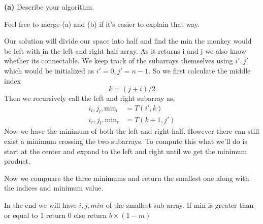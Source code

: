 \documentclass[12pt]{article}
\newcommand{\question}[3][Q]{
\begin{description}
\item \textbf{#1{#2}} #3
\end{description}
}
\newcommand{\note}[1]{{\footnotesize
    \begin{description}
    [leftmargin=3.4em,style=nextline]
        \item[Note:] {#1}
    \end{description}}   
}
\begin{document}
\question[]{(a)}{
    Describe your algorithm.
    \note{Feel free to merge (a) and (b) if it's easier to explain that way.}
}
\begin{answer}
    Our solution will divide our space into half and find the min the monkey would be left with in the left and right half array. As it returns i and j we also know whether its connectable. We keep track of the subarrays themselves using $i',j'$ which would be initialized as $i' = 0, j' = n - 1$. So we first calculate the middle index
    $$ k = (j + i) /2 $$ 
    Then we recursively call the left and right subarray as, 
    \begin{align*}
        i_l, j_l, \text{min}_l &= T(i', k)\\
        i_r, j_l, \text{min}_r &= T(k + 1, j') 
    \end{align*}
    Now we have the minimum of both the left and right half. However there can still exist a minimum crossing the two subarrays. To compute this what we'll do is start at the center and expand to the left and right until we get the minimum product. 

    Now we compuare the three minimums and return the smallest one along with the indices and minimum value.

    In the end we will have $i,j,min$ of the smallest sub array. If min is greater than or equal to 1 return 0 else return $b \times (1 - m)$

\end{answer}
\end{document}
